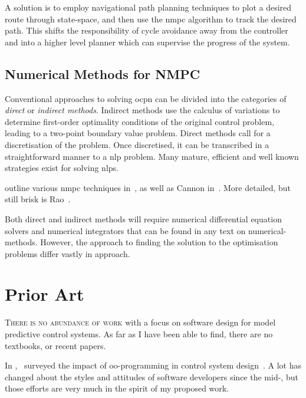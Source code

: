 A solution is to employ navigational path planning techniques to plot a desired
route through state-space, and then use the \ac{nmpc} algorithm to track the
desired path. This shifts the responsibility of cycle avoidance away from the
controller and into a higher level planner which can supervise the progress of
the system.



\subsection{Numerical Methods for NMPC}
\label{subsec:lit:numerical-methods}


Conventional approaches to solving \ac{ocpn} can be divided into the categories
of \emph{direct} or \emph{indirect methods}. Indirect methods use the calculus
of variations to determine first-order optimality conditions of the original
control problem, leading to a two-point boundary value problem. Direct methods
call for a discretisation of the problem. Once discretised, it can be
transcribed in a straightforward manner to a \ac{nlp} problem. Many mature,
efficient and well known strategies exist for solving \acp{nlp}.

\citeauthor{Findeisen2002} outline various \ac{nmpc} techniques
in~\cite{Findeisen2002}, as well as Cannon in~\cite{Cannon2004}. More detailed,
but still brisk is Rao~\cite{rao2009survey}.

Both direct and indirect methods will require numerical differential equation
solvers and numerical integrators that can be found in any text on
numerical-methods. However, the approach to finding the solution to the
optimisation problems differ vastly in approach.



\section{Prior Art}%
\label{sec:prior-art}


\textsc{There is no abundance of work} with a focus on software design for model
predictive control systems. As far as I have been able to find, there are no
textbooks, or recent papers.

In ,\ \citeauthor{Jobling1994} surveyed the impact
of \ac{oo}-programming in control system design~\cite{Jobling1994}. A lot has
changed about the styles and attitudes of software developers since the
mid-, but those efforts are very much in the spirit of my proposed
work.

